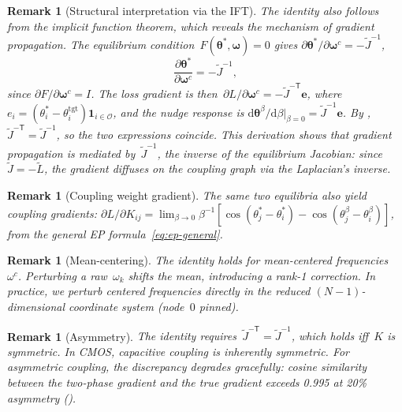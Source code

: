 \documentclass[11pt,a4paper]{article}
\newtheorem{remark}[theorem]{Remark}
\newcommand{\dd}{\mathrm{d}}
\newcommand{\pd}[2]{\frac{\partial #1}{\partial #2}}
\newcommand{\thetastar}{\bm{\theta}^*}
\newcommand{\thetabeta}{\bm{\theta}^\beta}
\newcommand{\bomega}{\bm{\omega}}
\newcommand{\transpose}{\mathsf{T}}
\begin{document}
\begin{remark}[Structural interpretation via the IFT]
  \label{rem:ift}
  The identity also follows from the implicit function theorem, which
  reveals the mechanism of gradient propagation. The equilibrium
  condition~$F(\thetastar, \bomega) = 0$ gives
  $\partial \thetastar / \partial \bomega^c = -\tilde{J}^{-1}$,
  \begin{equation}
    \pd{\thetastar}{\bomega^c} = -\tilde{J}^{-1},
    \label{eq:ift}
  \end{equation}
  since $\partial F / \partial \bomega^c = I$. The loss gradient is
  then~$\partial L / \partial \bomega^c = -\tilde{J}^{-\transpose}
  \bm{e}$, where~$e_i = (\theta_i^* - \theta_i^{\mathrm{tgt}})
  \mathbf{1}_{i \in \mathcal{O}}$, and the nudge response is
  $\dd \thetabeta / \dd \beta |_{\beta=0} = \tilde{J}^{-1}\bm{e}$.
  By , $\tilde{J}^{-\transpose} = \tilde{J}^{-1}$,
  so the two expressions coincide. This derivation shows that gradient
  propagation is mediated by~$\tilde{J}^{-1}$, the inverse of the
  equilibrium Jacobian: since~$\tilde{J} = -\tilde{L}$, the gradient
  diffuses on the coupling graph via the Laplacian's inverse.
\end{remark}

\begin{remark}[Coupling weight gradient]
  \label{rem:coupling-gradient}
  The same two equilibria also yield coupling gradients:
  $\partial L / \partial K_{ij} = \lim_{\beta \to 0}
  \beta^{-1}[\cos(\theta_j^* - \theta_i^*) -
  \cos(\theta_j^\beta - \theta_i^\beta)]$,
  from the general EP formula~\eqref{eq:ep-general}.
\end{remark}

\begin{remark}[Mean-centering]
  \label{rem:mean-centering}
  The identity holds for mean-centered frequencies~$\omega^c$. Perturbing
  a raw~$\omega_k$ shifts the mean, introducing a rank-1 correction. In
  practice, we perturb centered frequencies directly in the reduced
  $(N{-}1)$-dimensional coordinate system (node~$0$ pinned).
\end{remark}

\begin{remark}[Asymmetry]
  \label{rem:asymmetry}
  The identity requires~$\tilde{J}^{-\transpose} = \tilde{J}^{-1}$, which
  holds iff~$K$ is symmetric. In CMOS, capacitive coupling is inherently
  symmetric. For asymmetric coupling, the discrepancy degrades gracefully:
  cosine similarity between the two-phase gradient and the true gradient
  exceeds 0.995 at 20\% asymmetry ().
\end{remark}
\end{document}
